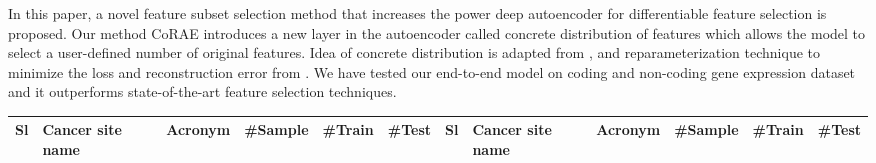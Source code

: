 \documentclass{bioinfo}
\begin{document}
In this paper, a novel feature subset selection method that increases the power deep autoencoder for differentiable feature selection is proposed. Our method CoRAE introduces a new layer in the autoencoder called concrete distribution of features which allows the model to select a user-defined number of original features. Idea of concrete distribution is adapted from \citep{maddison2016concrete, kingma2013auto}, and reparameterization technique to minimize the loss and reconstruction error from \citep{abid2019concrete}. 
We have tested our end-to-end model on coding and non-coding gene expression dataset and it outperforms state-of-the-art feature selection techniques. 

\begin{table}[hbt]
 {\begin{tabular}{@{}llllll|llllll@{}}\toprule Sl	&	Cancer site name	&	Acronym	&	\#Sample	&	\#Train	&	\#Test	&	Sl	&	Cancer site name	&	Acronym	&	\#Sample	&	\#Train	&	\#Test\\\midrule


\end{tabular}}
\end{table}
\end{document}
